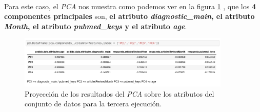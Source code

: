 \paragraph{}
Para este caso, el \textit{PCA} nos muestra como podemos ver en la figura \ref{pcaThreeAtributos} , que los \textbf{4 componentes principales} son, \textbf{el atributo \textit{diagnostic\_main}, el atributo \textit{Month}, el atributo \textit{pubmed\_keys} y el atributo \textit{age}}.

\begin{figure}[!htb]
  \centering
    \includegraphics[width=0.9\textwidth]{images/resultados_procesado_de_datos_pca3_atributos.png}
    \caption{Proyección de los resultados del \textit{PCA} sobre los atributos del conjunto de datos para la tercera ejecución.}
  \label{pcaThreeAtributos}
\end{figure}
